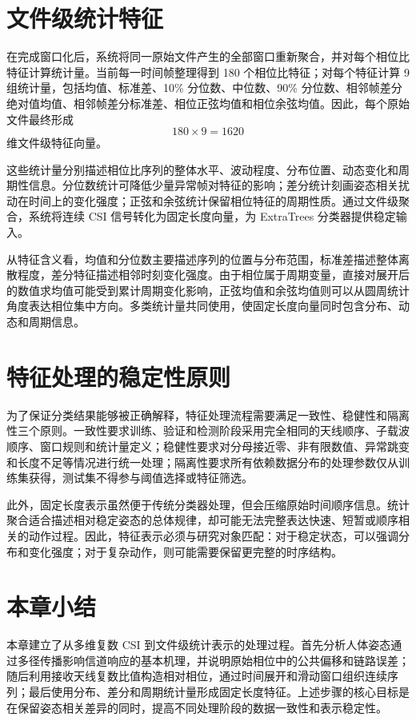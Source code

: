 \section{文件级统计特征}
在完成窗口化后，系统将同一原始文件产生的全部窗口重新聚合，并对每个相位比特征计算统计量。当前每一时间帧整理得到 180 个相位比特征；对每个特征计算 9 组统计量，包括均值、标准差、10\% 分位数、中位数、90\% 分位数、相邻帧差分绝对值均值、相邻帧差分标准差、相位正弦均值和相位余弦均值。因此，每个原始文件最终形成
\begin{equation}
180\times 9=1620
\end{equation}
维文件级特征向量。

这些统计量分别描述相位比序列的整体水平、波动程度、分布位置、动态变化和周期性信息。分位数统计可降低少量异常帧对特征的影响；差分统计刻画姿态相关扰动在时间上的变化强度；正弦和余弦统计保留相位特征的周期性质。通过文件级聚合，系统将连续 CSI 信号转化为固定长度向量，为 ExtraTrees 分类器提供稳定输入。

从特征含义看，均值和分位数主要描述序列的位置与分布范围，标准差描述整体离散程度，差分特征描述相邻时刻变化强度。由于相位属于周期变量，直接对展开后的数值求均值可能受到累计周期变化影响，正弦均值和余弦均值则可以从圆周统计角度表达相位集中方向。多类统计量共同使用，使固定长度向量同时包含分布、动态和周期信息。

\section{特征处理的稳定性原则}
为了保证分类结果能够被正确解释，特征处理流程需要满足一致性、稳健性和隔离性三个原则。一致性要求训练、验证和检测阶段采用完全相同的天线顺序、子载波顺序、窗口规则和统计量定义；稳健性要求对分母接近零、非有限数值、异常跳变和长度不足等情况进行统一处理；隔离性要求所有依赖数据分布的处理参数仅从训练集获得，测试集不得参与阈值选择或特征筛选。

此外，固定长度表示虽然便于传统分类器处理，但会压缩原始时间顺序信息。统计聚合适合描述相对稳定姿态的总体规律，却可能无法完整表达快速、短暂或顺序相关的动作过程。因此，特征表示必须与研究对象匹配：对于稳定状态，可以强调分布和变化强度；对于复杂动作，则可能需要保留更完整的时序结构。

\section{本章小结}
本章建立了从多维复数 CSI 到文件级统计表示的处理过程。首先分析人体姿态通过多径传播影响信道响应的基本机理，并说明原始相位中的公共偏移和链路误差；随后利用接收天线复数比值构造相对相位，通过时间展开和滑动窗口组织连续序列；最后使用分布、差分和周期统计量形成固定长度特征。上述步骤的核心目标是在保留姿态相关差异的同时，提高不同处理阶段的数据一致性和表示稳定性。
